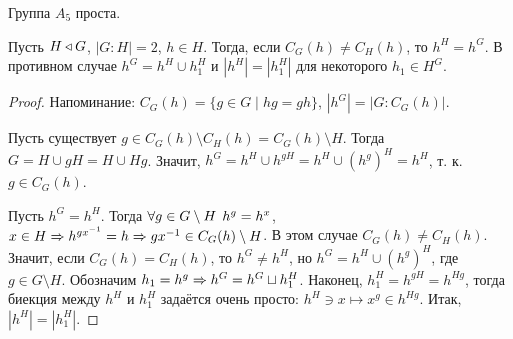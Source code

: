 \documentclass[main]{subfiles}
\begin{document}
\begin{theorem}
  Группа $A_5$ проста.
\end{theorem}
\begin{lemma}
  Пусть $H \triangleleft G$, $|G:H| = 2$, $h \in H$.
  Тогда, если $C_G(h) \ne C_H(h)$, то $h^H = h^G$.
  В противном случае $h^G = h^H \cup h_1^H$ и $|h^H|
  = |h_1^H|$ для некоторого $h_1 \in H^G$.
\end{lemma}
\begin{proof}
  Напоминание: $C_G(h) = \{ g \in G \mid hg = gh \}$,
  $|h^G| = |G : C_G(h)|$.

  Пусть существует $g \in C_G(h) \setminus C_H(h) = C_G(h) \setminus H$.
  Тогда $G = H \cup gH = H \cup Hg$. Значит, $h^G = h^H \cup h^{gH} =
  h^H \cup (h^g)^H = h^H$, т. к. $g \in C_G(h)$.

  Пусть $h^G = h^H$. Тогда $\forall {g \in G \setminus H} \; \,
  h^g = h^x$, $x \in H \Rightarrow h^{gx^{-1}} = h \Rightarrow gx^{-1} \in C_G(h) \setminus H$.
  В этом случае $C_G(h) \ne C_H(h)$.
  Значит, если $C_G(h) = C_H(h)$, то $h^G \ne h^H$, но $h^G =
  h^H \cup (h^g)^H$, где $g \in G \setminus H$. Обозначим
  $h_1 = h^g \Rightarrow h^G = h^G \sqcup h_1^H$. Наконец,
  $h_1^H = h^{gH} = h^{Hg}$, тогда биекция между
  $h^H$ и $h_1^H$ задаётся очень просто: $h^H \ni x \mapsto x^g \in h^{Hg}$.
  Итак, $|h^H| = |h_1^H|$.
\end{proof}
\end{document}
